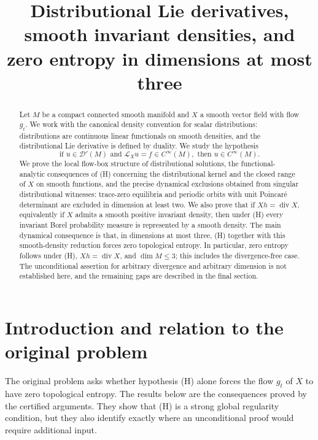 \documentclass[12pt]{article}
\title{Distributional Lie derivatives, smooth invariant densities, and zero entropy in dimensions at most three}
\author{}
\date{}
\theoremstyle{definition}
\newcommand{\D}{\mathcal{D}}
\DeclareMathOperator{\Div}{div}
\begin{document}
\maketitle

\begin{abstract}
Let \(M\) be a compact connected smooth manifold and \(X\) a smooth vector field with flow \(g_t\).  We work with the canonical density convention for scalar distributions: distributions are continuous linear functionals on smooth densities, and the distributional Lie derivative is defined by duality.  We study the hypothesis
\[
\tag{H}
\text{if }u\in \D'(M)\text{ and }\mathcal L_X u=f\in C^\infty(M),\text{ then }u\in C^\infty(M).
\]
We prove the local flow-box structure of distributional solutions, the functional-analytic consequences of (H) concerning the distributional kernel and the closed range of \(X\) on smooth functions, and the precise dynamical exclusions obtained from singular distributional witnesses: trace-zero equilibria and periodic orbits with unit Poincar\'e determinant are excluded in dimension at least two.  We also prove that if \(Xh=\Div X\), equivalently if \(X\) admits a smooth positive invariant density, then under (H) every invariant Borel probability measure is represented by a smooth density.  The main dynamical consequence is that, in dimensions at most three, (H) together with this smooth-density reduction forces zero topological entropy.  In particular, zero entropy follows under (H), \(Xh=\Div X\), and \(\dim M\le 3\); this includes the divergence-free case.  The unconditional assertion for arbitrary divergence and arbitrary dimension is not established here, and the remaining gaps are described in the final section.
\end{abstract}

\section{Introduction and relation to the original problem}

The original problem asks whether hypothesis (H) alone forces the flow \(g_t\) of \(X\) to have zero topological entropy.  The results below are the consequences proved by the certified arguments.  They show that (H) is a strong global regularity condition, but they also identify exactly where an unconditional proof would require additional input.
\end{document}
